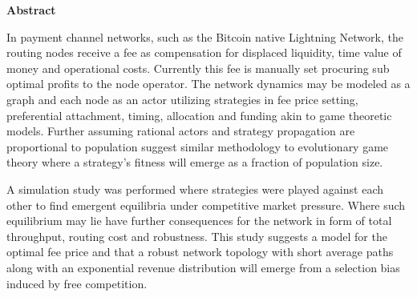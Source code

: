 \begin{center}
	\textbf{Abstract}
\end{center} 

In payment channel networks, such as the Bitcoin native Lightning Network, the routing nodes receive a fee as compensation for displaced liquidity, time value of money and operational costs. Currently this fee is manually set procuring sub optimal profits to the node operator. The network dynamics may be modeled as a graph and each node as an actor utilizing strategies in fee price setting, preferential attachment, timing, allocation and funding akin to game theoretic models. Further assuming rational actors and strategy propagation are proportional to population suggest similar methodology to evolutionary game theory where a strategy's fitness will emerge as a fraction of population size. 

A simulation study was performed where strategies were played against each other to find emergent equilibria under competitive market pressure. Where such equilibrium may lie have further consequences for the network in form of total throughput, routing cost and robustness. This study suggests a model for the optimal fee price and that a robust network topology with short average paths along with an exponential revenue distribution will emerge from a selection bias induced by free competition.


